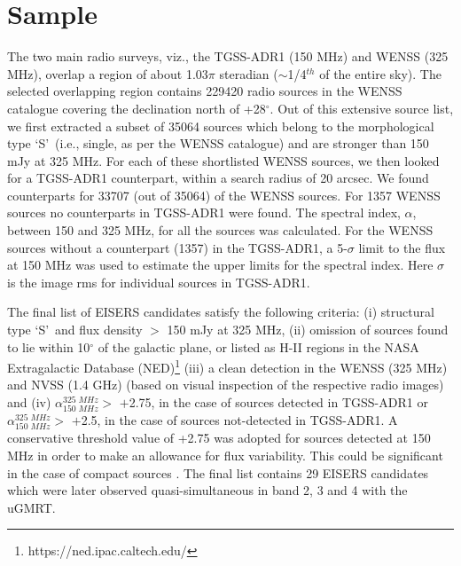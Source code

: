 \documentclass[proof]{WileyASNA-v1}
\begin{document}



\section{Sample}\label{sec3}
The two main radio surveys, viz., the TGSS-ADR1 (150 MHz) and WENSS (325 MHz), overlap a region of about 1.03$\pi$ steradian ($\sim$1/4$^{th}$ of the entire sky). The selected overlapping region contains 229420 radio sources in the WENSS catalogue covering the declination north of +28$^\circ$. Out of this extensive source list, we first extracted a subset of 35064 sources which belong to the morphological type \lq S\rq~(i.e., single, as per the WENSS catalogue) and are stronger than 150 mJy at 325 MHz. For each of these shortlisted WENSS sources, we then looked for a TGSS-ADR1 counterpart, within a search radius of 20 arcsec. We found counterparts for 33707 (out of 35064) of the WENSS sources. For 1357 WENSS sources no counterparts in TGSS-ADR1 were found. %
The spectral index, $\alpha$, between 150 and 325 MHz, for all the sources was calculated. For the WENSS sources without a counterpart (1357) in the TGSS-ADR1, a 5-$\sigma$ limit to the flux at 150 MHz was used to estimate the upper limits for the spectral index. Here $\sigma$ is the image rms for individual sources in TGSS-ADR1.    

The final list of EISERS candidates satisfy the following criteria: (i) structural type \lq S\rq~and flux density $>$ 150 mJy at 325 MHz, (ii) omission of sources found to lie within 10$^{\circ}$ of the galactic plane, or listed as H-II regions in the NASA Extragalactic Database (NED)\footnote{https://ned.ipac.caltech.edu/} (iii) a clean detection in the WENSS (325 MHz) and NVSS (1.4 GHz) (based on visual inspection of the respective radio images) and (iv) $\alpha^{325\;MHz}_{150\;MHz} >$ $+$2.75, in the case of sources detected in TGSS-ADR1 or $\alpha^{325\;MHz}_{150\;MHz} >$ $+$2.5, in the case of sources not-detected in TGSS-ADR1. A conservative threshold value of +2.75 was adopted for sources detected at 150 MHz in order to make an allowance for flux variability. This could be significant in the case of compact sources \citep{Bell2018,Chhetri2018}. The final list contains 29 EISERS candidates which were later observed quasi-simultaneous in band 2, 3 and 4 with the uGMRT.
\end{document}
